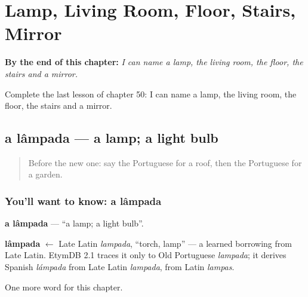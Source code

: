 
\chapter{Lamp, Living Room, Floor, Stairs, Mirror}
\label{ch:pt-lamp-living-room-floor-stairs-mirror}

\begin{chapteropening}
\textbf{By the end of this chapter:} \emph{I can name a lamp, the living room, the floor, the stairs and a mirror.}

Complete the last lesson of chapter 50: I can name a lamp, the living room, the floor, the stairs and a mirror.
\end{chapteropening}

\section[a lâmpada]{a lâmpada — a lamp; a light bulb}

\label{lesson:PT-C50-lampada}



\begin{quote}
Before the new one: say the Portuguese for a roof, then the Portuguese for a garden.
\end{quote}

\subsection*{You'll want to know: a lâmpada}
\textbf{a lâmpada} — \textquotedblleft{}a lamp; a light bulb\textquotedblright{}.

\begin{cousinweb}
\textbf{lâmpada} $\leftarrow$ Late Latin \emph{lampada}, \textquotedblleft{}torch, lamp\textquotedblright{} — a learned borrowing from Late Latin. EtymDB 2.1 traces it only to Old Portuguese \emph{lampada}; it derives Spanish \emph{lámpada} from Late Latin \emph{lampada}, from Latin \emph{lampas}.
\end{cousinweb}

\begin{grammarlens}[title={What you've built}]
One more word for this chapter.
\end{grammarlens}

